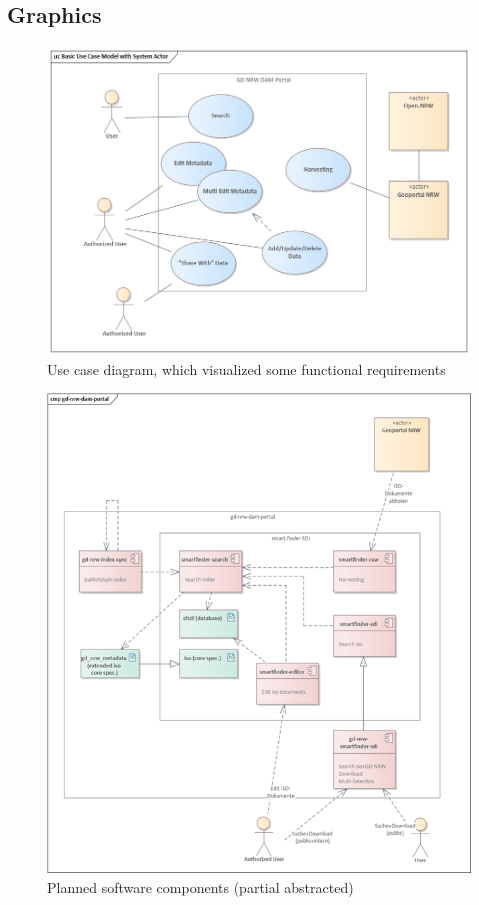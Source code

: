 \documentclass[11pt, titlepage, a4paper]{article}
\begin{document}
\begin{appendices}
    \section{Graphics}
    \begin{figure}[H]
        \caption{Use case diagram, which visualized some functional requirements}
        \label{fig:usecase}
        \includegraphics[width=16cm]{usecase_diagramm.png}
        \centering
    \end{figure}
    \begin{figure}[H]
        \caption{Planned software components (partial abstracted)}
        \label{fig:components}
        \includegraphics[width=16cm]{components_.png}
        \centering
    \end{figure}


\end{appendices}
\end{document}
